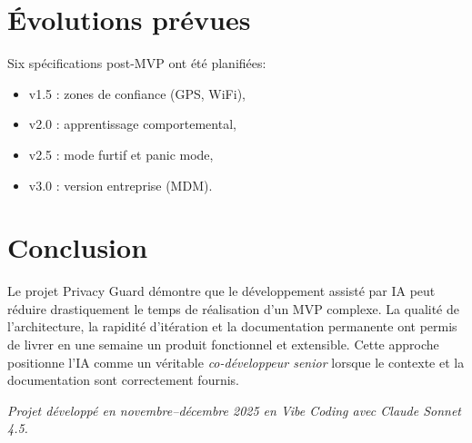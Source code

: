 \documentclass[11pt,a4paper]{article}
\begin{document}
\section{Évolutions prévues}

Six spécifications post-MVP ont été planifiées:
\begin{itemize}
    \item v1.5 : zones de confiance (GPS, WiFi),
    \item v2.0 : apprentissage comportemental,
    \item v2.5 : mode furtif et panic mode,
    \item v3.0 : version entreprise (MDM).
\end{itemize}


\section{Conclusion}

Le projet Privacy Guard démontre que le développement assisté par IA peut réduire drastiquement le temps de réalisation d'un MVP complexe.
La qualité de l'architecture, la rapidité d'itération et la documentation permanente ont permis de livrer en une semaine un produit fonctionnel et extensible.
Cette approche positionne l'IA comme un véritable \emph{co-développeur senior} lorsque le contexte et la documentation sont correctement fournis.

\vspace{4mm}
\noindent\textit{Projet développé en novembre--décembre 2025 en Vibe Coding avec Claude Sonnet 4.5.}
\end{document}
